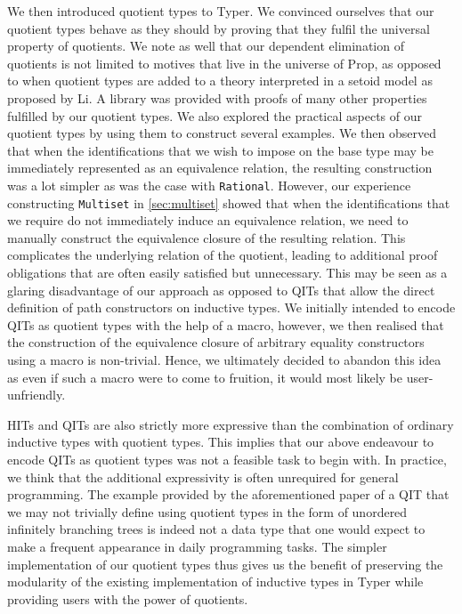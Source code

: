 \documentclass[12pt,twoside,maitrise]{dms}
\theoremstyle{definition}
\numberwithin{equation}{section}
\numberwithin{table}{chapter}
\numberwithin{figure}{chapter}
\newcommand\id[1] {\texttt{#1}}
\newcommand\type[1] {\textsf{#1}} %
\begin{document}
We then introduced quotient types to Typer. We convinced ourselves that our
quotient types behave as they should by proving that they fulfil the universal
property of quotients. We note as well that our dependent elimination of
quotients is not limited to motives that live in the universe of \type{Prop}, as
opposed to when quotient types are added to a theory interpreted in a setoid
model as proposed by Li\cite{li2015quotient}. A library was provided with proofs
of many other properties fulfilled by our quotient types. We also explored the
practical aspects of our quotient types by using them to construct several
examples. We then observed that when the identifications that we wish to impose
on the base type may be immediately represented as an equivalence relation, the
resulting construction was a lot simpler as was the case with \id{Rational}.
However, our experience constructing \id{Multiset} in \autoref{sec:multiset}
showed that when the identifications that we require do not immediately induce
an equivalence relation, we need to manually construct the equivalence closure
of the resulting relation. This complicates the underlying relation of the
quotient, leading to additional proof obligations that are often easily
satisfied but unnecessary. This may be seen as a glaring disadvantage of our
approach as opposed to QITs that allow the direct definition of path
constructors on inductive types. We initially intended to encode QITs as
quotient types with the help of a macro, however, we then realised that the
construction of the equivalence closure of arbitrary equality constructors using
a macro is non-trivial. Hence, we ultimately decided to abandon this idea as
even if such a macro were to come to fruition, it would most likely be
user-unfriendly.

HITs and QITs are also strictly more expressive than the combination of ordinary
inductive types with quotient types\cite{fiore2022quotients}. This implies that
our above endeavour to encode QITs as quotient types was not a feasible task to
begin with. In practice, we think that the additional expressivity is often
unrequired for general programming. The example provided by the aforementioned
paper of a QIT that we may not trivially define using quotient types in the form
of unordered infinitely branching trees is indeed not a data type that one would
expect to make a frequent appearance in daily programming tasks. The simpler
implementation of our quotient types thus gives us the benefit of preserving the
modularity of the existing implementation of inductive types in Typer while
providing users with the power of quotients.
\end{document}
